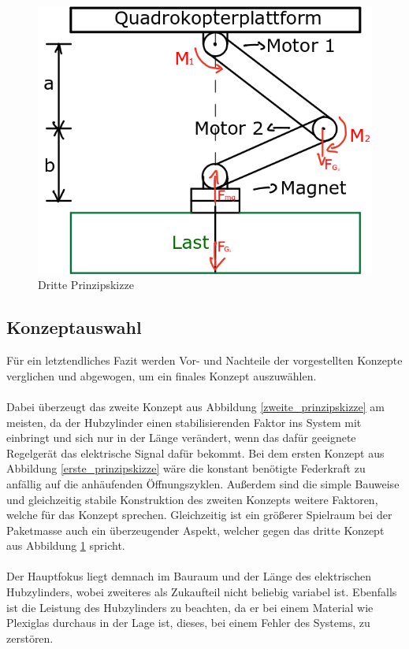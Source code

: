 \begin{figure}[h]
	\begin{center}
	\includegraphics[scale=0.7]{"Grafiken/Skizze3mechanik.png"}
	\caption{Dritte Prinzipskizze}
	\label{dritte_prinzipskizze}
	\end{center}
\end{figure}
\newpage
\subsection{Konzeptauswahl}
Für ein letztendliches Fazit werden Vor- und Nachteile der vorgestellten Konzepte verglichen und abgewogen, um ein finales Konzept auszuwählen.\\
\\
Dabei überzeugt das zweite Konzept aus Abbildung \ref{zweite_prinzipskizze} am meisten, da der Hubzylinder einen stabilisierenden Faktor ins System mit einbringt und sich nur in der Länge verändert, wenn das dafür geeignete Regelgerät das elektrische Signal dafür bekommt. Bei dem ersten Konzept aus Abbildung \ref{erste_prinzipskizze} wäre die konstant benötigte Federkraft zu anfällig auf die anhäufenden Öffnungszyklen. Außerdem sind die simple Bauweise und gleichzeitig stabile Konstruktion des zweiten Konzepts weitere Faktoren, welche für das Konzept sprechen. Gleichzeitig ist ein größerer Spielraum bei der Paketmasse auch ein überzeugender Aspekt, welcher gegen das dritte Konzept aus Abbildung \ref{dritte_prinzipskizze} spricht.\\
\\
Der Hauptfokus liegt demnach im Bauraum und der Länge des elektrischen Hubzylinders, wobei zweiteres als Zukaufteil nicht beliebig variabel ist. Ebenfalls ist die Leistung des Hubzylinders zu beachten, da er bei einem Material wie Plexiglas durchaus in der Lage ist, dieses, bei einem Fehler des Systems, zu zerstören.

